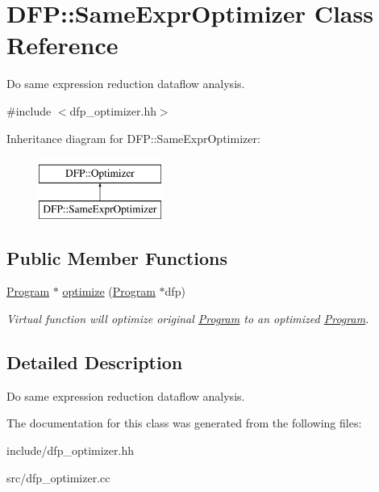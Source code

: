 \hypertarget{class_d_f_p_1_1_same_expr_optimizer}{}\section{D\+FP\+:\+:Same\+Expr\+Optimizer Class Reference}
\label{class_d_f_p_1_1_same_expr_optimizer}


Do same expression reduction dataflow analysis.  




{\ttfamily \#include $<$dfp\+\_\+optimizer.\+hh$>$}

Inheritance diagram for D\+FP\+:\+:Same\+Expr\+Optimizer\+:\begin{figure}[H]
\begin{center}
\leavevmode
\includegraphics[height=2.000000cm]{class_d_f_p_1_1_same_expr_optimizer}
\end{center}
\end{figure}
\subsection*{Public Member Functions}
\begin{DoxyCompactItemize}
\item 
\hyperlink{class_d_f_p_1_1_program}{Program} $\ast$ \hyperlink{class_d_f_p_1_1_same_expr_optimizer_acf0209f121e89ba066c8d9020fcba0da}{optimize} (\hyperlink{class_d_f_p_1_1_program}{Program} $\ast$dfp)\hypertarget{class_d_f_p_1_1_same_expr_optimizer_acf0209f121e89ba066c8d9020fcba0da}{}\label{class_d_f_p_1_1_same_expr_optimizer_acf0209f121e89ba066c8d9020fcba0da}

\begin{DoxyCompactList}\small\item\em Virtual function will optimize original \hyperlink{class_d_f_p_1_1_program}{Program} to an optimized \hyperlink{class_d_f_p_1_1_program}{Program}. \end{DoxyCompactList}\end{DoxyCompactItemize}


\subsection{Detailed Description}
Do same expression reduction dataflow analysis. 

The documentation for this class was generated from the following files\+:\begin{DoxyCompactItemize}
\item 
include/dfp\+\_\+optimizer.\+hh\item 
src/dfp\+\_\+optimizer.\+cc\end{DoxyCompactItemize}
